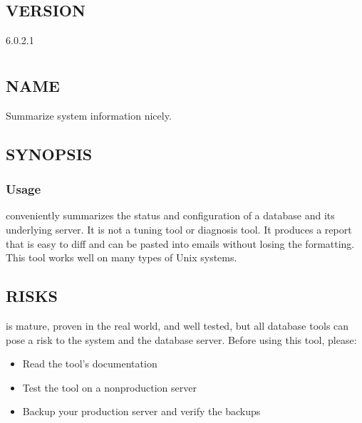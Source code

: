 \documentclass[letterpaper,10pt,english]{sphinxmanual}
\begin{document}
\section{VERSION}
\label{\detokenize{mariadb-status-diff:version}}
 6.0.2.1


\chapter{}
\label{\detokenize{mariadb-summary:mariadb-summary}}\label{\detokenize{mariadb-summary::doc}}

\section{NAME}
\label{\detokenize{mariadb-summary:name}}
 \sphinxhyphen{} Summarize system information nicely.


\section{SYNOPSIS}
\label{\detokenize{mariadb-summary:synopsis}}

\subsection{Usage}
\label{\detokenize{mariadb-summary:usage}}
\begin{sphinxVerbatim}[commandchars=\\\{\}]
\end{sphinxVerbatim}

 conveniently summarizes the status and configuration of
a database and its underlying server. It is not a tuning tool or diagnosis tool.
It produces a report that is easy to diff and can be pasted into emails without
losing the formatting. This tool works well on many types of Unix systems.


\section{RISKS}
\label{\detokenize{mariadb-summary:risks}}
 is mature, proven in the real world, and well tested,
but all database tools can pose a risk to the system and the database
server.  Before using this tool, please:
\begin{itemize}
\item {} 
Read the tool’s documentation

\item {} 
Test the tool on a non\sphinxhyphen{}production server

\item {} 
Backup your production server and verify the backups

\end{itemize}
\end{document}

